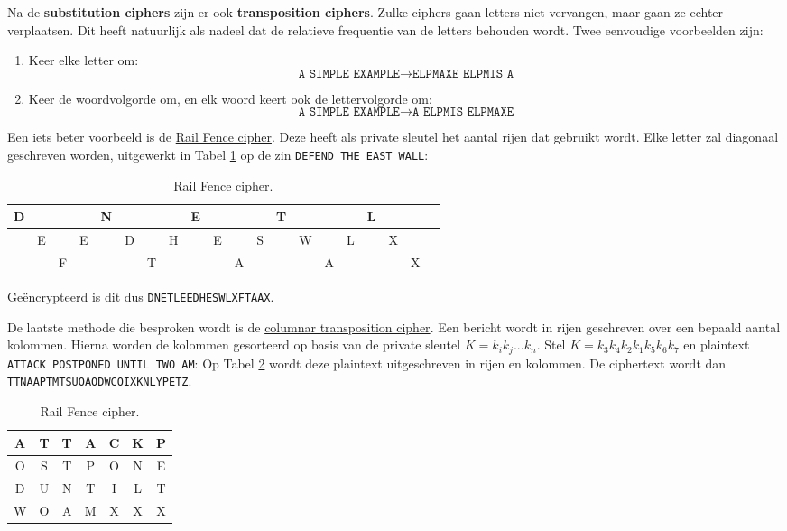 \documentclass{report}
\begin{document}
	Na de \textbf{substitution ciphers} zijn er ook \textbf{transposition ciphers}. Zulke ciphers gaan letters niet vervangen, maar gaan ze echter verplaatsen. Dit heeft natuurlijk als nadeel dat de relatieve frequentie van de letters behouden wordt. Twee eenvoudige voorbeelden zijn:
	\begin{enumerate}
		\item Keer elke letter om:
			$$\texttt{A SIMPLE EXAMPLE} \rightarrow \texttt{ELPMAXE ELPMIS A}$$
		\item Keer de woordvolgorde om, en elk woord keert ook de lettervolgorde om:
			$$\texttt{A SIMPLE EXAMPLE} \rightarrow \texttt{A ELPMIS ELPMAXE}$$
	\end{enumerate}
	Een iets beter voorbeeld is de \underline{Rail Fence cipher}. Deze heeft als private sleutel het aantal rijen dat gebruikt wordt. Elke letter zal diagonaal geschreven worden, uitgewerkt in Tabel \ref{table:railfence} op de zin \texttt{DEFEND THE EAST WALL}: 
	\begin{table}[ht]
		\centering
		\begin{tabular}{|c|c|c|c|c|c|c|c|c|c|c|c|c|c|c|c|c|c|c|c|}
			\hline
			D & & & & N & & & & E & & & & T & & & & L & & \\
			\hline
			& E & & E & & D & & H & & E & & S & & W & & L & & X & \\
			\hline
			& & F & & & & T & & & & A & & & & A & & & & X \\
			\hline
		\end{tabular}
		\caption{Rail Fence cipher.}
		\label{table:railfence}
	\end{table}
	Geëncrypteerd is dit dus \texttt{DNETLEEDHESWLXFTAAX}.

	De laatste methode die besproken wordt is de \underline{columnar transposition cipher}. Een bericht wordt in rijen geschreven over een bepaald aantal kolommen. Hierna worden de kolommen gesorteerd op basis van de private sleutel $K = k_ik_j ... k_n$. Stel $K = k_3k_4k_2k_1k_5k_6k_7$ en plaintext \texttt{ATTACK POSTPONED UNTIL TWO AM}: Op Tabel \ref{table:columnartransposition} wordt deze plaintext uitgeschreven in rijen en kolommen. De ciphertext wordt dan \texttt{TTNAAPTMTSUOAODWCOIXKNLYPETZ}.
	\begin{table}[ht]
		\centering
		\begin{tabular}{|c|c|c|c|c|c|c|}
			\hline
			A & T & T & A & C & K & P \\
			\hline
			O & S & T & P & O & N & E \\
			\hline
			D & U & N & T & I & L & T \\
			\hline
			W & O & A & M & X & X & X \\
			\hline
		\end{tabular}
		\caption{Rail Fence cipher.}
		\label{table:columnartransposition}
	\end{table}
\end{document}

